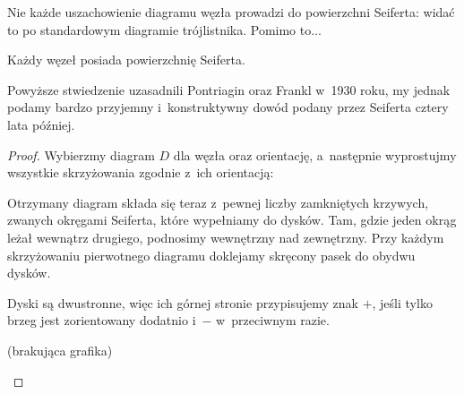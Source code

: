 Nie każde uszachowienie diagramu węzła prowadzi do powierzchni Seiferta:
widać to po standardowym diagramie trójlistnika.
Pomimo to...

\begin{proposition}
    \label{seifert_existence}
    Każdy węzeł posiada powierzchnię Seiferta.
\end{proposition}

Powyższe stwiedzenie uzasadnili Pontriagin oraz Frankl w~1930 roku, my jednak podamy bardzo przyjemny i~konstruktywny dowód podany przez Seiferta cztery lata później.

\begin{proof}
    Wybierzmy diagram $D$ dla węzła oraz orientację,
    a~następnie wyprostujmy wszystkie skrzyżowania zgodnie z~ich orientacją:
\begin{comment}
    \[
    \begin{tikzpicture}[scale=0.12, baseline=-3]
        \begin{knot}[clip width=15, end tolerance=1pt,flip crossing/.list={1}]
            \strand[semithick,Latex-] (-5,5) to (5,-5);
            \strand[semithick,-Latex] (-5,-5) to (5,5);
        \end{knot}
    \end{tikzpicture}
    \quad\longrightarrow\quad
        \begin{tikzpicture}[baseline=-0.65ex, scale=0.12]
        \useasboundingbox (-5, -6) rectangle (5, 6);
        \draw[semithick,-Latex] (-4, -5) to [out=45, in=-45] (-4, 5);
        \draw[semithick,-Latex] (4, -5) to [out=135, in=-135] (4, 5);
        \end{tikzpicture}
        \quad\longleftarrow\quad
    \begin{tikzpicture}[scale=0.12, baseline=-3]
        \begin{knot}[clip width=15, end tolerance=1pt]
            \strand[semithick,Latex-] (-5,5) to (5,-5);
            \strand[semithick,-Latex] (-5,-5) to (5,5);
        \end{knot}
    \end{tikzpicture}
    \]
\end{comment}

    Otrzymany diagram składa się teraz z~pewnej liczby zamkniętych krzywych,
    zwanych okręgami Seiferta, które wypełniamy do dysków.
    Tam, gdzie jeden okrąg leżał wewnątrz drugiego, podnosimy wewnętrzny nad zewnętrzny.
    Przy każdym skrzyżowaniu pierwotnego diagramu doklejamy skręcony pasek do obydwu dysków.

    Dyski są dwustronne, więc ich górnej stronie przypisujemy znak $+$,
    jeśli tylko brzeg jest zorientowany dodatnio i~$-$ w~przeciwnym razie.

    \begin{center}
        (brakująca grafika)
    \end{center}
\end{proof}

